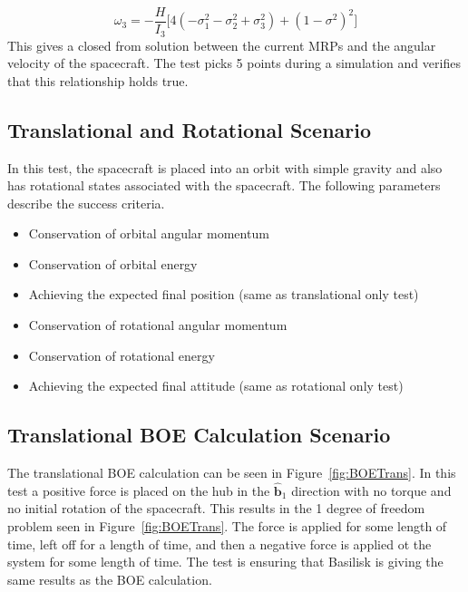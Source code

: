 \begin{equation}
\omega_3 = -\frac{H}{I_3} \Big[4 (-\sigma_1^2 - \sigma_2^2 + \sigma_3^2) + (1 - \sigma^2)^2\Big]
\end{equation}
This gives a closed from solution between the current MRPs and the angular velocity of the spacecraft. The test picks 5 points during a simulation and verifies that this relationship holds true.

\subsection{Translational and Rotational Scenario}
In this test, the spacecraft is placed into an orbit with simple gravity and also has rotational states associated with the spacecraft. The following parameters describe the success criteria.
\begin{itemize}
	\item Conservation of orbital angular momentum
	\item Conservation of orbital energy
	\item Achieving the expected final position (same as translational only test)
	\item Conservation of rotational angular momentum
	\item Conservation of rotational energy
	\item Achieving the expected final attitude (same as rotational only test)
\end{itemize}

\subsection{Translational BOE Calculation Scenario}

The translational BOE calculation can be seen in Figure~\ref{fig:BOETrans}. In this test a positive force is placed on the hub in the $\hat{\bm b}_1$ direction with no torque and no initial rotation of the spacecraft. This results in the 1 degree of freedom problem seen in Figure~\ref{fig:BOETrans}. The force is applied for some length of time, left off for a length of time, and then a negative force is applied ot the system for some length of time. The test is ensuring that Basilisk is giving the same results as the BOE calculation. 

